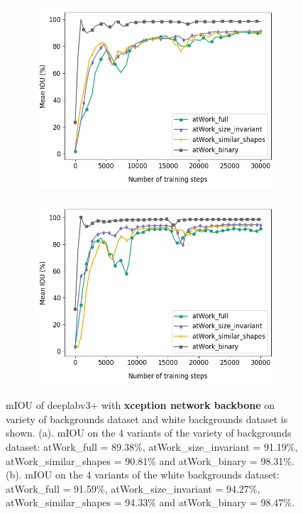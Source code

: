 	\begin{figure}
		\begin{subfigure}{.5\textwidth}
			\centering
			\includegraphics[width=1\linewidth]{images/xcep_4vars}
			\label{Fig:xcepvarsa}
			\caption{}
		\end{subfigure}
		\begin{subfigure}{.5\textwidth}
			\centering
			\includegraphics[width=1\linewidth]{images/xcep_4vars_white}
			\label{Fig:xcepvarsb}
			\caption{}
		\end{subfigure}
		\caption{mIOU of deeplabv3+ with \textbf{xception network backbone} on variety of backgrounds dataset and white backgrounds dataset is shown. (a). mIOU on the 4 variants of the variety of backgrounds dataset: atWork\_full = 89.38\%, atWork\_size\_invariant = 91.19\%, atWork\_similar\_shapes = 90.81\% and atWork\_binary = 98.31\%. (b). mIOU on the 4 variants of the white backgrounds dataset: atWork\_full = 91.59\%, atWork\_size\_invariant = 94.27\%, atWork\_similar\_shapes = 94.33\% and atWork\_binary = 98.47\%.}
		\label{Fig:xcepvars}
	\end{figure}

